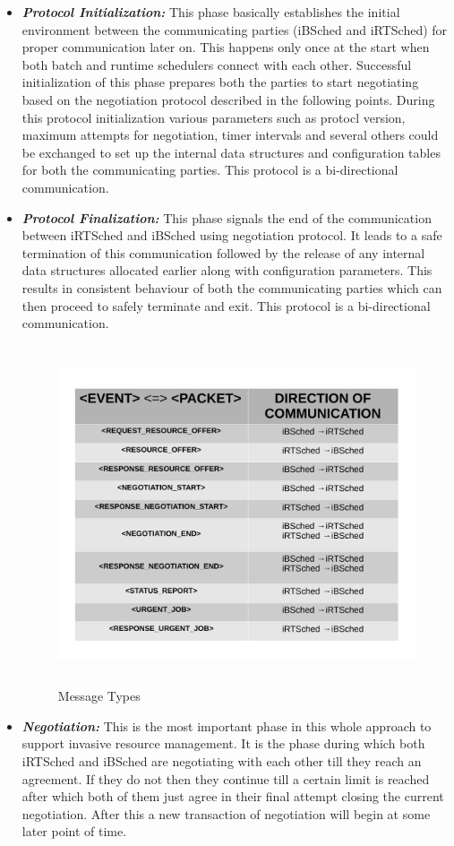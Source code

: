 \begin{itemize}
\item \textbf{\textit{Protocol Initialization:}} This phase basically establishes the initial environment between the communicating parties (iBSched and iRTSched) for proper communication later on. This happens only once at the start when both batch and runtime schedulers connect with each other. Successful initialization of this phase prepares both the parties to start negotiating based on the negotiation protocol described in the following points. During this protocol initialization various parameters such as protocl version, maximum attempts for negotiation, timer intervals and several others could be exchanged to set up the internal data structures and configuration tables for both the communicating parties. This protocol is a bi-directional communication.
\item \textbf{\textit{Protocol Finalization:}} This phase signals the end of the communication between iRTSched and iBSched using negotiation protocol. It leads to a safe termination of this communication followed by the release of any internal data structures allocated earlier along with configuration parameters. This results in consistent behaviour of both the communicating parties which can then proceed to safely terminate and exit. This protocol is a bi-directional communication.
\begin{figure}[h]
\centering
\includegraphics[width=1.0\textwidth, height=100mm]{./figures/table.pdf}
\caption{Message Types}
\label{fig:8}
\end{figure}
\item \textbf{\textit{Negotiation:}} This is the most important phase in this whole approach to support invasive resource management. It is the phase during which both iRTSched and iBSched are negotiating with each other till they reach an agreement. If they do not then they continue till a certain limit is reached after which both of them just agree in their final attempt closing the current negotiation. After this a new transaction of negotiation will begin at some later point of time.

\end{itemize}
